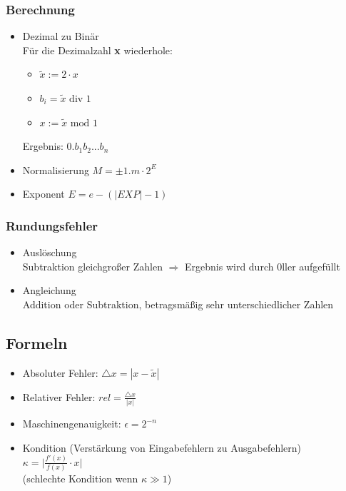 \subsubsection*{Berechnung}
\begin{itemize}

	\item Dezimal zu Binär \\
	Für die Dezimalzahl \textbf{x} wiederhole:
	\begin{itemize}
		\item $\widetilde{x} := 2 \cdot x$
		\item $b_i = \widetilde{x}\text{ div }1$
		\item $x := \widetilde{x}\text{ mod }1$
	\end{itemize}
	Ergebnis: $0.b_1b_2...b_n$
	
	\item Normalisierung $M = \pm 1.m \cdot 2^E$ \\
	
	\item Exponent $E = e - (|EXP|-1)$ \\

\end{itemize}

\subsubsection*{Rundungsfehler}
\begin{itemize}

	\item Auslöschung \\
	Subtraktion gleichgroßer Zahlen $\Rightarrow$ Ergebnis wird durch 0ller aufgefüllt
	
	\item Angleichung \\
	Addition oder Subtraktion, betragsmäßig sehr unterschiedlicher Zahlen

\end{itemize}

\subsection{Formeln}
\begin{itemize}

	\item Absoluter Fehler: $\bigtriangleup x = |x - \widetilde{x}|$
	
	\item Relativer Fehler: $rel = \frac{\bigtriangleup x}{|x|}$
	
	\item Maschinengenauigkeit: $\epsilon = 2^{-n}$
	
	\item Kondition (Verstärkung von Eingabefehlern zu Ausgabefehlern) \\
	$\kappa = \bigg|\frac{f'(x)}{f(x)} \cdot x\bigg|$\\
	(schlechte Kondition wenn $\kappa \gg 1$) 

\end{itemize}
